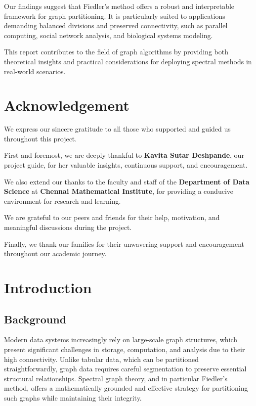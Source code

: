 \documentclass[hidelinks,12pt]{article}
\begin{document}
\vspace{1em}
\noindent
Our findings suggest that Fiedler’s method offers a robust and interpretable framework for graph partitioning. It is particularly suited to applications demanding balanced divisions and preserved connectivity, such as parallel computing, social network analysis, and biological systems modeling.

\vspace{1em}
\noindent
This report contributes to the field of graph algorithms by providing both theoretical insights and practical considerations for deploying spectral methods in real-world scenarios.

\newpage
\section{Acknowledgement}

\parbox{0.9\textwidth}{
We express our sincere gratitude to all those who supported and guided us throughout this project.

\vspace{1em}
First and foremost, we are deeply thankful to \textbf{Kavita Sutar Deshpande}, our project guide, for her valuable insights, continuous support, and encouragement.

\vspace{1em}
We also extend our thanks to the faculty and staff of the \textbf{Department of Data Science} at \textbf{Chennai Mathematical Institute}, for providing a conducive environment for research and learning.

\vspace{1em}
We are grateful to our peers and friends for their help, motivation, and meaningful discussions during the project.

\vspace{1em}
Finally, we thank our families for their unwavering support and encouragement throughout our academic journey.
}

\newpage
\section{Introduction}

\subsection*{Background}
Modern data systems increasingly rely on large-scale graph structures, which present significant challenges in storage, computation, and analysis due to their high connectivity. Unlike tabular data, which can be partitioned straightforwardly, graph data requires careful segmentation to preserve essential structural relationships. Spectral graph theory, and in particular Fiedler’s method, offers a mathematically grounded and effective strategy for partitioning such graphs while maintaining their integrity.
\end{document}
